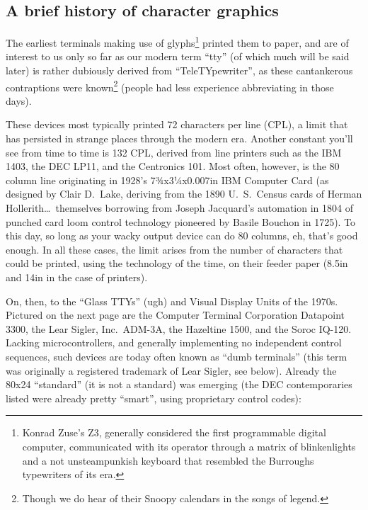 \documentclass[letterpaper,10pt]{article}
\begin{document}
\begin{appendices}
\section{A brief history of character graphics}
The earliest terminals making use of glyphs\footnote{Konrad Zuse's Z3, generally
 considered the first programmable digital computer, communicated with its
operator through a matrix of blinkenlights and a not unsteampunkish keyboard that resembled the
Burroughs typewriters of its era\cite{zuse}.} printed them to paper, and are of
interest to us only so far as our modern term ``tty'' (of which much will be
said later) is rather dubiously derived from ``TeleTYpewriter'', as these
cantankerous contraptions were known\footnote{Though we do hear of their Snoopy
calendars in the songs of legend\cite{quiche}.} (people had less experience
abbreviating in those days).

These devices most typically printed 72 characters per line (CPL), a limit that
has persisted in strange places\cite{pandoc} through the modern era. Another constant
you'll see from time to time is 132 CPL, derived from line printers such as the
IBM 1403, the DEC LP11, and the Centronics 101\cite{ibm1403}. Most often,
however, is the 80 column line originating in 1928's 7¾x3¼x0.007in IBM
Computer Card (as designed by Clair D.\ Lake, deriving from the 1890 U.\ S.\
Census cards of Herman Hollerith\ldots\ themselves borrowing from Joseph
Jacquard's automation in 1804 of punched card loom control technology pioneered
by Basile Bouchon in 1725\cite{cards}). To this day, so long as your wacky
output device can do 80 columns, eh, that's good enough. In all these cases,
the limit arises from the number of characters that could be printed, using the
technology of the time, on their feeder paper (8.5in and 14in in the case of
printers).

On, then, to the ``Glass TTYs'' (ugh) and Visual Display Units of the 1970s.
Pictured on the next page are the Computer Terminal Corporation Datapoint 3300, the
Lear Sigler, Inc.\ ADM-3A, the Hazeltine 1500, and the Soroc IQ-120.
Lacking microcontrollers, and generally implementing no independent control
sequences, such devices are today often known as ``dumb terminals'' (this term
was originally a registered trademark of Lear Sigler, see below). Already the
80x24 ``standard'' (it is not a standard) was emerging (the DEC contemporaries
listed were already pretty ``smart'', using proprietary control codes):


\end{appendices}
\end{document}
